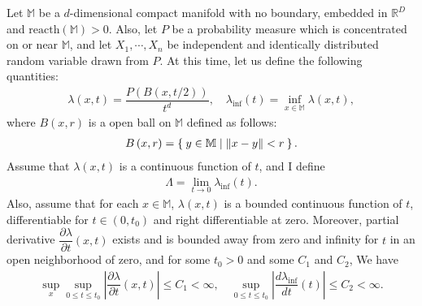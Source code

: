 \documentclass[dvipdfmx,11pt,notheorems]{article}
\begin{document}
Let $\mathbb{M}$ be a $d$-dimensional compact manifold with no boundary, embedded in $\mathbb{R}^D$ and $\mathrm{reacth}\left( \mathbb{M} \right) > 0$. Also, let $P$ be a probability measure which is concentrated on or near $\mathbb{M}$, and let $X_1, \cdots, X_n$ be independent and identically distributed random variable drawn from $P$. At this time, let us define the following quantities:
\begin{align}
  \lambda\left( x, t \right) = \dfrac{ P\left( B\left( x, t / 2 \right) \right) }{ t^d },\quad \lambda_{\inf}\left( t \right) = \inf_{x\in\mathbb{M}} \lambda\left( x,t \right), \label{eq:definition-of-lamda}
\end{align}
where $B\left( x,r \right)$ is a open ball on $\mathbb{M}$ defined as follows:
\begin{align*}
  B\left( x, r \right) = \Set{ y\in\mathbb{M} | \left\| x - y \right\| < r	}.
\end{align*}
Assume that $\lambda\left( x, t \right)$ is a continuous function of $t$, and I define
\begin{align*}
  \Lambda = \lim_{t \to 0} \lambda_{\inf} \left( t \right).
\end{align*}
Also, assume that for each $x \in \mathbb{M}$, $\lambda\left( x, t \right)$ is a bounded continuous function of $t$, differentiable for $t \in \left( 0, t_0 \right)$ and right differentiable at zero. Moreover, partial derivative $\dfrac{\partial \lambda}{\partial t} \left( x, t \right)$ exists and is bounded away from zero and infinity for $t$ in an open neighborhood of zero, and for some $t_0 > 0$ and some $C_1$ and $C_2$, We have
\begin{align}
  \sup_{x} \sup_{0\leq t\leq t_0} \left| \dfrac{\partial \lambda}{\partial t} \left( x, t \right) \right| \leq C_1 < \infty,\quad \sup_{0\leq t \leq t_0} \left| \dfrac{d \lambda_{\inf}}{dt} \left( t \right) \right| \leq C_2 < \infty. \label{eq:assumption-of-lambda}
\end{align}
\end{document}
